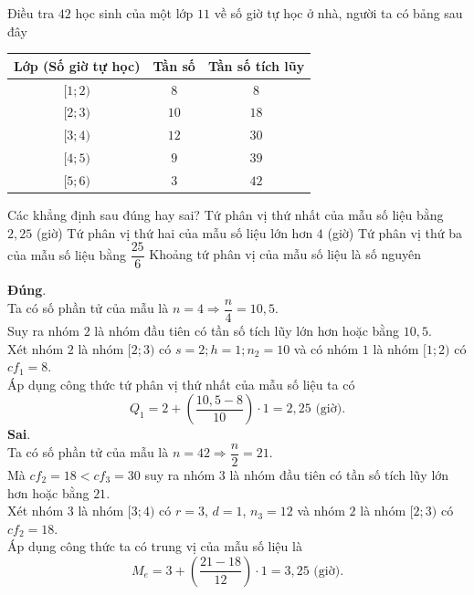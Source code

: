 \begin{ex}%
Điều tra $42$ học sinh của một lớp $11$ về số giờ tự học ở nhà, người ta có bảng sau đây
\begin{center}
\begin{tabular}{|c|c|c|}
\hline
Lớp (Số giờ tự học) & Tần số & Tần số tích lũy \\
\hline
$[1;2)$& $8$ & $8$ \\
\hline
$[2;3)$& $10$ & $18$ \\
\hline
$[3;4)$& $12$ & $30$ \\
\hline
$[4;5)$& $9$ & $39$ \\
\hline
$[5;6)$& $3$ & $42$ \\
\hline
\end{tabular}
\end{center}
Các khẳng định sau đúng hay sai?
\choiceTF
{\True Tứ phân vị thứ nhất của mẫu số liệu bằng $2{,}25$ (giờ)}
{Tứ phân vị thứ hai của mẫu số liệu lớn hơn $4$ (giờ)}
{\True Tứ phân vị thứ ba của mẫu số liệu bằng $\dfrac{25}{6}$}
{ Khoảng tứ phân vị của mẫu số liệu là số nguyên}
\loigiai
{
\begin{itemchoice}
\itemch \textbf{Đúng}.\\
Ta có số phần tử của mẫu là $n=4\Rightarrow \dfrac{n}{4}=10{,}5$.\\
Suy ra nhóm $2$ là nhóm đầu tiên có tần số tích lũy lớn hơn hoặc bằng $10{,}5$.\\
Xét nhóm $2$ là nhóm $[2;3)$ có $s=2; h=1; n_2=10$ và có nhóm $1$ là nhóm $[1;2)$ có $cf_1=8$.\\
Áp dụng công thức tứ phân vị thứ nhất của mẫu số liệu ta có \[Q_1=2+\left(\dfrac{10{,}5-8}{10}\right)\cdot 1=2{,}25\,\,\text{(giờ)}.\]
\itemch \textbf{Sai}.\\
Ta có số phần tử của mẫu là $n=42\Rightarrow \dfrac{n}{2}=21$.\\
Mà $cf_2=18<cf_3=30$ suy ra nhóm $3$ là nhóm đầu tiên có tần số tích lũy lớn hơn hoặc bằng $21$.\\
Xét nhóm $3$ là nhóm $[3;4)$ có $r=3$, $d=1$, $n_3=12$ và nhóm $2$ là nhóm $[2;3)$ có $cf_2=18$.\\
Áp dụng công thức ta có trung vị của mẫu số liệu là \[M_e=3+\left(\dfrac{21-18}{12}\right)\cdot 1=3{,}25\,\,\text{(giờ)}.\]

\end{itemchoice}}
\end{ex}
